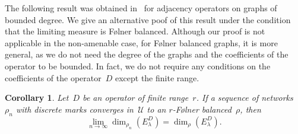 \documentclass[english]{article}
\newtheorem{corollary}[lemma]{Corollary}
\theoremstyle{definition}
\begin{document}
The following result was obtained in~\cite{ATV} for adjacency operators on graphs of bounded degree. We give an alternative poof of this result under the condition that the limiting measure is {F\o lner} balanced. Although our proof is not applicable in the non-amenable case, for {F\o lner} balanced graphs, it is more general, as we do not need the degree of the graphs and the coefficients of the operator to be bounded. In fact, we do not require any conditions on the coefficients of the operator~$D$ except the finite range. 
\begin{corollary}\label{corollary:approximation}
    Let~$D$ be an operator of finite range~$r$. If a sequence of networks~$\rho_n$ with discrete marks converges in~$\mathcal{U}$ to an $r$-{F\o lner} balanced~$\rho$, then 
    $$
    \lim_{n \to \infty}\dim_{\rho_n}(E_\lambda^D) = \dim_\rho (E_\lambda^D).
    $$
\end{corollary}
\end{document}
